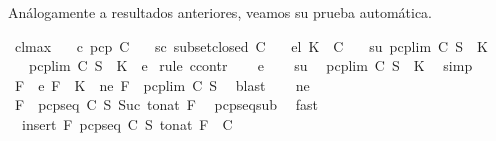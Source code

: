 \begin{isabellebody}
\isamarkupfalse%
%
\endisatagproof
{\isafoldproof}%
%
\isadelimproof
%
\endisadelimproof
%
\begin{isamarkuptext}%
Análogamente a resultados anteriores, veamos su prueba automática.%
\end{isamarkuptext}\isamarkuptrue%
\isamarkupfalse%
\ cl{\isacharunderscore}max{\isacharcolon}\isanewline
\ \ \ c{\isacharcolon}\ {\isachardoublequoteopen}pcp\ C{\isachardoublequoteclose}\isanewline
\ \ \ sc{\isacharcolon}\ {\isachardoublequoteopen}subset{\isacharunderscore}closed\ C{\isachardoublequoteclose}\isanewline
\ \ \ el{\isacharcolon}\ {\isachardoublequoteopen}K\ {\isasymin}\ C{\isachardoublequoteclose}\isanewline
\ \ \ su{\isacharcolon}\ {\isachardoublequoteopen}pcp{\isacharunderscore}lim\ C\ S\ {\isasymsubseteq}\ K{\isachardoublequoteclose}\isanewline
\ \ \ {\isachardoublequoteopen}pcp{\isacharunderscore}lim\ C\ S\ {\isacharequal}\ K{\isachardoublequoteclose}\ {\isacharparenleft}\ {\isacharquery}e{\isacharparenright}\isanewline
%
\isadelimproof
%
\endisadelimproof
%
\isatagproof
{}\isamarkupfalse%
\ {\isacharparenleft}rule\ ccontr{\isacharparenright}\isanewline
\ \ \isamarkupfalse%
\ {\isacartoucheopen}{\isasymnot}{\isacharquery}e{\isacartoucheclose}\isanewline
\ \ \isamarkupfalse%
\ su\ \isamarkupfalse%
\ {\isachardoublequoteopen}pcp{\isacharunderscore}lim\ C\ S\ {\isasymsubset}\ K{\isachardoublequoteclose}\ \isamarkupfalse%
\ simp\isanewline
\ \ \isamarkupfalse%
\ \isamarkupfalse%
\ F\ \ e{\isacharcolon}\ {\isachardoublequoteopen}F\ {\isasymin}\ K{\isachardoublequoteclose}\ \ ne{\isacharcolon}\ {\isachardoublequoteopen}F\ {\isasymnotin}\ pcp{\isacharunderscore}lim\ C\ S{\isachardoublequoteclose}\ \isamarkupfalse%
\ blast\isanewline
\ \ \isamarkupfalse%
\ ne\ \isamarkupfalse%
\ {\isachardoublequoteopen}F\ {\isasymnotin}\ pcp{\isacharunderscore}seq\ C\ S\ {\isacharparenleft}Suc\ {\isacharparenleft}to{\isacharunderscore}nat\ F{\isacharparenright}{\isacharparenright}{\isachardoublequoteclose}\ \isamarkupfalse%
\ pcp{\isacharunderscore}seq{\isacharunderscore}sub\ \isamarkupfalse%
\ fast\isanewline
\ \ \isamarkupfalse%
\ {}{\isacharcolon}\ {\isachardoublequoteopen}insert\ F\ {\isacharparenleft}pcp{\isacharunderscore}seq\ C\ S\ {\isacharparenleft}to{\isacharunderscore}nat\ F{\isacharparenright}{\isacharparenright}\ {\isasymnotin}\ C{\isachardoublequoteclose}\ \isamarkupfalse%

\end{isabellebody}
